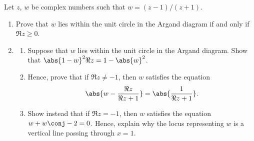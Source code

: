 \begin{problem}
    Let $z$, $w$ be complex numbers such that $w = (z-1)/(z+1)$.

    \begin{enumerate}
        \item Prove that $w$ lies within the unit circle in the Argand diagram if and only if $\Re z \geq 0$.
        \item \begin{enumerate}
            \item Suppose that $w$ lies within the unit circle in the Argand diagram. Show that $\abs{1 - w}^2 \Re z = 1- \abs{w}^2$.
            \item Hence, prove that if $\Re z \neq -1$, then $w$ satisfies the equation \[\abs{w - \frac{\Re z}{\Re z + 1}} = \abs{\frac1{\Re z + 1}}.\]
            \item Show instead that if $\Re z = -1$, then $w$ satisfies the equation $w + w\conj -2 = 0$. Hence, explain why the locus representing $w$ is a vertical line passing through $x = 1$.
        \end{enumerate}
    \end{enumerate}
\end{problem}
\clearpage
